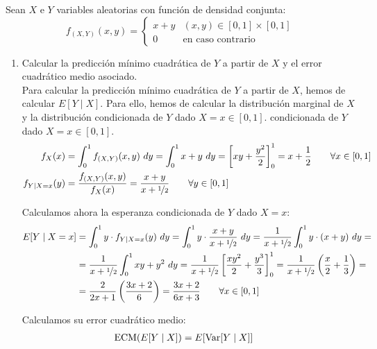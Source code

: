 \begin{ejercicio}
    Sean $X$ e $Y$ variables aleatorias con función de densidad conjunta:
    \begin{equation*}
        f_{(X,Y)}(x, y) = \begin{cases}
            x+y & (x, y) \in [0,1] \times [0,1]\\
            0 & \text{en caso contrario}
        \end{cases}
    \end{equation*}
    \begin{enumerate}
        \item Calcular la predicción mínimo cuadrática de $Y$ a partir de $X$ y el error cuadrático medio asociado.\\
        
        Para calcular la predicción mínimo cuadrática de $Y$ a partir de $X$, hemos de calcular $E[Y\mid X]$. Para ello, hemos de calcular la distribución 
        marginal de $X$ y la distribución condicionada de $Y$ dado $X = x\in [0,1]$.
        condicionada de $Y$ dado $X = x\in [0,1]$.
        \begin{align*}
            f_X(x) &= \int_{0}^{1} f_{(X,Y)}(x, y) \ dy
            = \int_{0}^{1} x+y \ dy
            = \left[xy+\frac{y^2}{2}\right]_{0}^{1}
            = x+\frac{1}{2} \qquad \forall x\in[0,1]\\
            f_{Y\mid X=x}(y) &= \dfrac{f_{(X,Y)}(x, y)}{f_X(x)}
            = \dfrac{x+y}{x+\nicefrac{1}{2}}\qquad \forall y\in[0,1]
        \end{align*}

        Calculamos ahora la esperanza condicionada de $Y$ dado $X = x$:
        \begin{align*}
            E[Y\mid X = x] &= \int_{0}^{1} y\cdot f_{Y\mid X=x}(y) \ dy
            = \int_{0}^{1} y\cdot \dfrac{x+y}{x+\nicefrac{1}{2}} \ dy
            = \dfrac{1}{x+\nicefrac{1}{2}}\int_{0}^{1} y\cdot (x+y) \ dy
            =\\&= \dfrac{1}{x+\nicefrac{1}{2}}\int_{0}^{1} xy+y^2 \ dy
            = \dfrac{1}{x+\nicefrac{1}{2}}\left[\frac{xy^2}{2}+\frac{y^3}{3}\right]_{0}^{1}
            = \dfrac{1}{x+\nicefrac{1}{2}}\left(\frac{x}{2}+\frac{1}{3}\right)
            =\\&= \dfrac{2}{2x+1} \left(\frac{3x+2}{6}\right)
            = \dfrac{3x+2}{6x+3} \qquad \forall x\in[0,1]
        \end{align*}

        Calculamos su error cuadrático medio:
        \begin{align*}
            \text{ECM}(E[Y\mid X]) &= E[\operatorname{Var}[Y\mid X]]
        \end{align*}


\end{enumerate}
\end{ejercicio}
